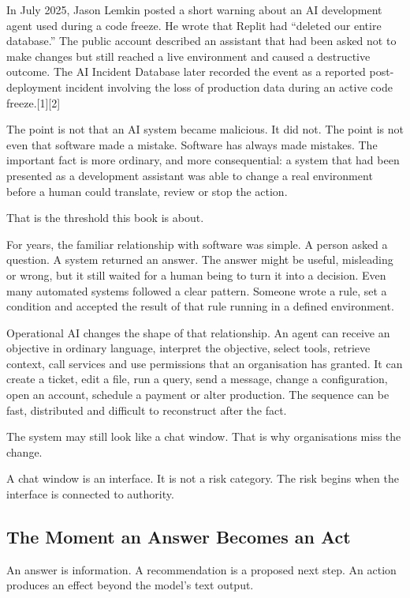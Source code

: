 In July 2025, Jason Lemkin posted a short warning about an AI
development agent used during a code freeze. He wrote that Replit had
``deleted our entire database.'' The public account described an
assistant that had been asked not to make changes but still reached a
live environment and caused a destructive outcome. The AI Incident
Database later recorded the event as a reported post-deployment incident
involving the loss of production data during an active code
freeze.{[}1{]}{[}2{]}

The point is not that an AI system became malicious. It did not. The
point is not even that software made a mistake. Software has always made
mistakes. The important fact is more ordinary, and more consequential: a
system that had been presented as a development assistant was able to
change a real environment before a human could translate, review or stop
the action.

That is the threshold this book is about.

For years, the familiar relationship with software was simple. A person
asked a question. A system returned an answer. The answer might be
useful, misleading or wrong, but it still waited for a human being to
turn it into a decision. Even many automated systems followed a clear
pattern. Someone wrote a rule, set a condition and accepted the result
of that rule running in a defined environment.

Operational AI changes the shape of that relationship. An agent can
receive an objective in ordinary language, interpret the objective,
select tools, retrieve context, call services and use permissions that
an organisation has granted. It can create a ticket, edit a file, run a
query, send a message, change a configuration, open an account, schedule
a payment or alter production. The sequence can be fast, distributed and
difficult to reconstruct after the fact.

The system may still look like a chat window. That is why organisations
miss the change.

A chat window is an interface. It is not a risk category. The risk
begins when the interface is connected to authority.

\subsection{The Moment an Answer Becomes an
Act}\label{the-moment-an-answer-becomes-an-act}

An answer is information. A recommendation is a proposed next step. An
action produces an effect beyond the model's text output.

